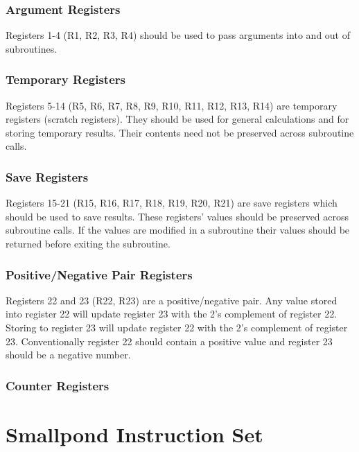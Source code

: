 \documentclass[12pt]{article}
\begin{document}
    \subsubsection{Argument Registers}
        Registers 1-4 (R1, R2, R3, R4) should be used to pass arguments into and out of subroutines.
        
    \subsubsection{Temporary Registers}
        Registers 5-14 (R5, R6, R7, R8, R9, R10, R11, R12, R13, R14) are temporary registers (scratch registers). They should be used for general calculations and for storing temporary results. Their contents need not be preserved across subroutine calls.
        
    \subsubsection{Save Registers}
        Registers 15-21 (R15, R16, R17, R18, R19, R20, R21) are save registers which should be used to save results. These registers' values should be preserved across subroutine calls. If the values are modified in a subroutine their values should be returned before exiting the subroutine.
        
    \subsubsection{Positive/Negative Pair Registers}
        Registers 22 and 23 (R22, R23) are a positive/negative pair. Any value stored into register 22 will update register 23 with the 2's complement of register 22. Storing to register 23 will update register 22 with the 2's complement of register 23. Conventionally register 22 should contain a positive value and register 23 should be a negative number.
        
    \subsubsection{Counter Registers}
        

\newpage
\section{Smallpond Instruction Set}
\end{document}
